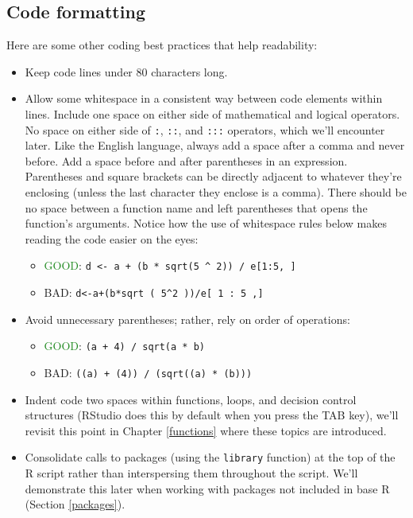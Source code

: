 \documentclass[
]{krantz}
\providecommand{\tightlist}{%
  \setlength{\itemsep}{0pt}\setlength{\parskip}{0pt}}
\begin{document}
\hypertarget{code-formatting}{%
\subsection{Code formatting}\label{code-formatting}}

Here are some other coding best practices that help readability:

\begin{itemize}
\tightlist
\item
  Keep code lines under 80 characters long.
\item
  Allow some whitespace in a consistent way between code elements within lines. Include one space on either side of mathematical and logical operators. No space on either side of \texttt{:}, \texttt{::}, and \texttt{:::} operators, which we'll encounter later. Like the English language, always add a space after a comma and never before. Add a space before and after parentheses in an expression. Parentheses and square brackets can be directly adjacent to whatever they're enclosing (unless the last character they enclose is a comma). There should be no space between a function name and left parentheses that opens the function's arguments. Notice how the use of whitespace rules below makes reading the code easier on the eyes:

  \begin{itemize}
  \tightlist
  \item
    \textcolor{ForestGreen}{GOOD}: \texttt{d\ \textless{}-\ a\ +\ (b\ *\ sqrt(5\ \^{}\ 2))\ /\ e{[}1:5,\ {]}}
  \item
    \textcolor{RedOrange}{BAD}: \texttt{d\textless{}-a+(b*sqrt\ (\ 5\^{}2\ ))/e{[}\ 1\ :\ 5\ ,{]}}
  \end{itemize}
\item
  Avoid unnecessary parentheses; rather, rely on order of operations:

  \begin{itemize}
  \tightlist
  \item
    \textcolor{ForestGreen}{GOOD}: \texttt{(a\ +\ 4)\ /\ sqrt(a\ *\ b)}
  \item
    \textcolor{RedOrange}{BAD}: \texttt{((a)\ +\ (4))\ /\ (sqrt((a)\ *\ (b)))}
  \end{itemize}
\item
  Indent code two spaces within functions, loops, and decision control structures (RStudio does this by default when you press the TAB key), we'll revisit this point in Chapter \ref{functions} where these topics are introduced.
\item
  Consolidate calls to packages (using the \texttt{library} function) at the top of the R script rather than interspersing them throughout the script. We'll demonstrate this later when working with packages not included in base R (Section \ref{packages}).
\end{itemize}
\end{document}
